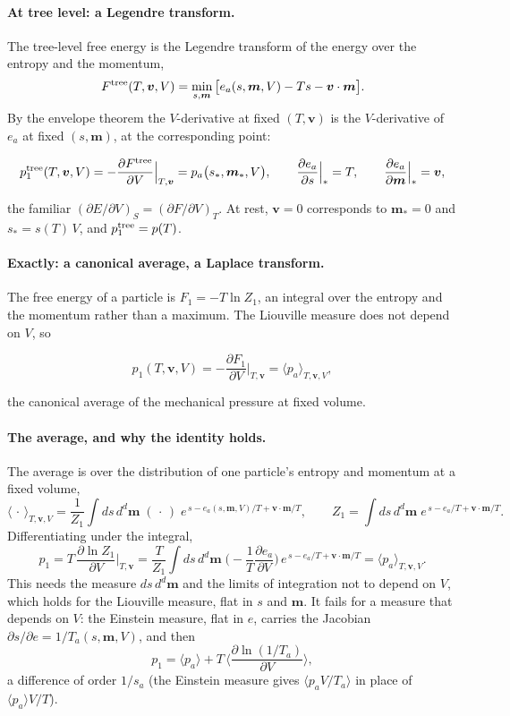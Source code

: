 \documentclass[11pt,aps,preprint,nofootinbib,superscriptaddress,tightenlines]{revtex4-2}
\newcommand{\avg}[1]{\langle #1\rangle}
\def\st{\begin{equation}}
\def\stp{\end{equation}}
\let\oldparagraph\paragraph
\renewcommand{\paragraph}{\par\bigskip\oldparagraph}
\begin{document}
\paragraph{At tree level: a Legendre transform.}  The tree-level free energy is the Legendre transform of the energy over the entropy and the momentum,
\st
F^{\rm tree}(T,\bm v,V)=\min_{s,\bm m}\big[e_a(s,\bm m,V)-Ts-\bm v\cdot\bm m\big] .
\stp
By the envelope theorem the $V$-derivative at fixed $(T,\bm v)$ is the $V$-derivative of $e_a$ at fixed $(s,\bm m)$, at the corresponding point:
\begin{keyeq}
\st
p_1^{\rm tree}(T,\bm v,V)=-\frac{\partial F^{\rm tree}}{\partial V}\Big|_{T,\bm v}=p_a\big(s_*,\bm m_*,V\big),\qquad
\frac{\partial e_a}{\partial s}\Big|_*=T,\qquad \frac{\partial e_a}{\partial\bm m}\Big|_*=\bm v ,
\stp
\end{keyeq}
the familiar $(\partial E/\partial V)_S=(\partial F/\partial V)_T$.  At rest, $\bm v=0$ corresponds to $\bm m_*=0$ and $s_*=s(T)\,V$, and $p_1^{\rm tree}=p(T)$.

\paragraph{Exactly: a canonical average, a Laplace transform.}  The free energy of a particle is $F_1=-T\ln Z_1$, an integral over the entropy and the momentum rather than a
maximum.  The Liouville measure does not depend on $V$, so
\begin{keyeq}
\st
p_1(T,\bm v,V)=-\frac{\partial F_1}{\partial V}\Big|_{T,\bm v}=\avg{p_a}_{T,\bm v,V} ,
\stp
\end{keyeq}
the canonical average of the mechanical pressure at fixed volume.

\paragraph{The average, and why the identity holds.}  The average is over the distribution of one particle's entropy and momentum at a fixed volume,
\st
\avg{\,\cdot\,}_{T,\bm v,V}=\frac1{Z_1}\int ds\,d^d\bm m\;(\,\cdot\,)\;e^{\,s-e_a(s,\bm m,V)/T+\bm v\cdot\bm m/T},\qquad Z_1=\int ds\,d^d\bm m\;e^{\,s-e_a/T+\bm v\cdot\bm m/T} .
\stp
Differentiating under the integral,
\st
p_1=T\,\frac{\partial\ln Z_1}{\partial V}\Big|_{T,\bm v}=\frac T{Z_1}\int ds\,d^d\bm m\;\Big(-\frac1T\frac{\partial e_a}{\partial V}\Big)\,e^{\,s-e_a/T+\bm v\cdot\bm m/T}=\avg{p_a}_{T,\bm v,V} .
\stp
This needs the measure $ds\,d^d\bm m$ and the limits of integration not to depend on $V$, which holds for the Liouville measure, flat in $s$ and $\bm m$.  It fails for a
measure that depends on $V$: the Einstein measure, flat in $e$, carries the Jacobian $\partial s/\partial e=1/T_a(s,\bm m,V)$, and then
\st
p_1=\avg{p_a}+T\,\Big\langle\frac{\partial\ln(1/T_a)}{\partial V}\Big\rangle ,
\stp
a difference of order $1/s_a$ (the Einstein measure gives $\avg{p_aV/T_a}$ in place of $\avg{p_a}V/T$).
\end{document}
